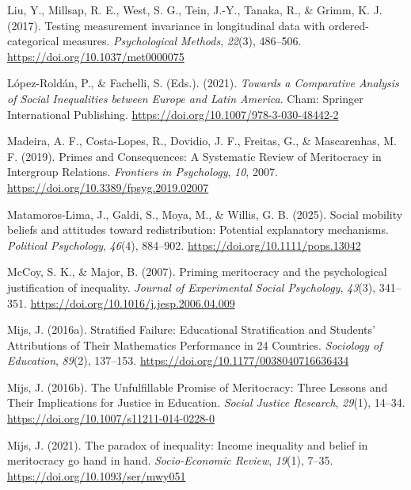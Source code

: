 \documentclass[
  13pt,
]{article}
\newlength{\cslhangindent}
\newenvironment{CSLReferences}[2] %
 {\begin{list}{}{%
  \setlength{\itemindent}{0pt}
  \setlength{\leftmargin}{0pt}
  \setlength{\parsep}{0pt}
  \ifodd #1
   \setlength{\leftmargin}{\cslhangindent}
   \setlength{\itemindent}{-1\cslhangindent}
  \fi
  \setlength{\itemsep}{#2\baselineskip}}}
 {\end{list}}
\begin{document}
\begin{CSLReferences}{1}{0}
Liu, Y., Millsap, R. E., West, S. G., Tein, J.-Y., Tanaka, R., \& Grimm,
K. J. (2017). Testing measurement invariance in longitudinal data with
ordered-categorical measures. \emph{Psychological Methods},
\emph{22}(3), 486--506. \url{https://doi.org/10.1037/met0000075}

López-Roldán, P., \& Fachelli, S. (Eds.). (2021). \emph{Towards a
{Comparative Analysis} of {Social Inequalities} between {Europe} and
{Latin America}}. Cham: Springer International Publishing.
\url{https://doi.org/10.1007/978-3-030-48442-2}

Madeira, A. F., Costa-Lopes, R., Dovidio, J. F., Freitas, G., \&
Mascarenhas, M. F. (2019). Primes and {Consequences}: {A Systematic
Review} of {Meritocracy} in {Intergroup Relations}. \emph{Frontiers in
Psychology}, \emph{10}, 2007.
\url{https://doi.org/10.3389/fpsyg.2019.02007}

Matamoros-Lima, J., Galdi, S., Moya, M., \& Willis, G. B. (2025). Social
mobility beliefs and attitudes toward redistribution: {Potential}
explanatory mechanisms. \emph{Political Psychology}, \emph{46}(4),
884--902. \url{https://doi.org/10.1111/pops.13042}

McCoy, S. K., \& Major, B. (2007). Priming meritocracy and the
psychological justification of inequality. \emph{Journal of Experimental
Social Psychology}, \emph{43}(3), 341--351.
\url{https://doi.org/10.1016/j.jesp.2006.04.009}

Mijs, J. (2016a). Stratified {Failure}: {Educational Stratification} and
{Students}' {Attributions} of {Their Mathematics Performance} in 24
{Countries}. \emph{Sociology of Education}, \emph{89}(2), 137--153.
\url{https://doi.org/10.1177/0038040716636434}

Mijs, J. (2016b). The {Unfulfillable Promise} of {Meritocracy}: {Three
Lessons} and {Their Implications} for {Justice} in {Education}.
\emph{Social Justice Research}, \emph{29}(1), 14--34.
\url{https://doi.org/10.1007/s11211-014-0228-0}

Mijs, J. (2021). The paradox of inequality: Income inequality and belief
in meritocracy go hand in hand. \emph{Socio-Economic Review},
\emph{19}(1), 7--35. \url{https://doi.org/10.1093/ser/mwy051}


\end{CSLReferences}
\end{document}
